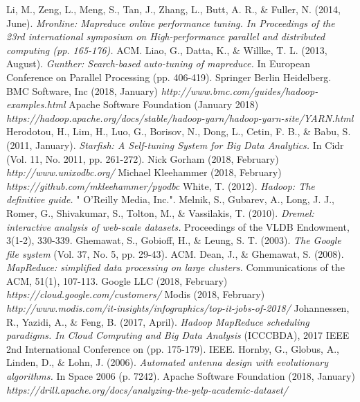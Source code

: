 \documentclass[a4paper,english]{report}
\begin{document}
	
	\begin{thebibliography}{1}
		Li, M., Zeng, L., Meng, S., Tan, J., Zhang, L., Butt, A. R., \& Fuller, N. (2014, June). \emph{Mronline: Mapreduce online performance tuning. In Proceedings of the 23rd international symposium on High-performance parallel and distributed computing (pp. 165-176).} ACM.
		Liao, G., Datta, K., \& Willke, T. L. (2013, August). \emph{Gunther: Search-based auto-tuning of mapreduce.} In European Conference on Parallel Processing (pp. 406-419). Springer Berlin Heidelberg.
		BMC Software, Inc (2018, January) \emph{http://www.bmc.com/guides/hadoop-examples.html}
		Apache Software Foundation (January 2018) \emph{https://hadoop.apache.org/docs/stable/hadoop-yarn/hadoop-yarn-site/YARN.html}
		Herodotou, H., Lim, H., Luo, G., Borisov, N., Dong, L., Cetin, F. B., \& Babu, S. (2011, January). \emph{Starfish: A Self-tuning System for Big Data Analytics.} In Cidr (Vol. 11, No. 2011, pp. 261-272).
		Nick Gorham (2018, February) \emph{http://www.unixodbc.org/}
		Michael Kleehammer (2018, February) \emph{https://github.com/mkleehammer/pyodbc}
		White, T. (2012). \emph{Hadoop: The definitive guide.} " O'Reilly Media, Inc.".
		Melnik, S., Gubarev, A., Long, J. J., Romer, G., Shivakumar, S., Tolton, M., \& Vassilakis, T. (2010). \emph{Dremel: interactive analysis of web-scale datasets.} Proceedings of the VLDB Endowment, 3(1-2), 330-339.
		Ghemawat, S., Gobioff, H., \& Leung, S. T. (2003). \emph{The Google file system} (Vol. 37, No. 5, pp. 29-43). ACM.
		Dean, J., \& Ghemawat, S. (2008). \emph{MapReduce: simplified data processing on large clusters.} Communications of the ACM, 51(1), 107-113.
		Google LLC (2018, February) \emph{https://cloud.google.com/customers/}
		Modis (2018, February) \emph{http://www.modis.com/it-insights/infographics/top-it-jobs-of-2018/}
		Johannessen, R., Yazidi, A., \& Feng, B. (2017, April). \emph{Hadoop MapReduce scheduling paradigms. In Cloud Computing and Big Data Analysis} (ICCCBDA), 2017 IEEE 2nd International Conference on (pp. 175-179). IEEE.
		Hornby, G., Globus, A., Linden, D., \& Lohn, J. (2006). \emph{Automated antenna design with evolutionary algorithms.} In Space 2006 (p. 7242).
		Apache Software Foundation (2018, January) \emph{https://drill.apache.org/docs/analyzing-the-yelp-academic-dataset/}

\end{thebibliography}
\end{document}

